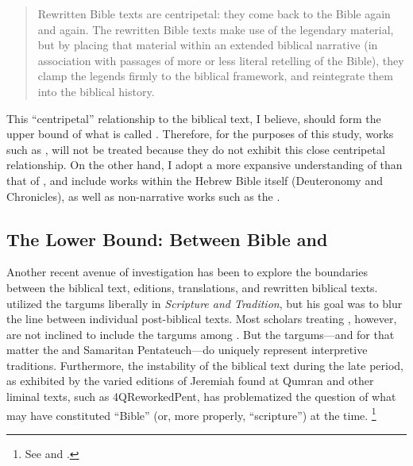 \begin{quote}
    Rewritten Bible texts are centripetal: they come back to the Bible again and again. The rewritten Bible texts make use of the legendary material, but by placing that material within an extended biblical narrative (in association with passages of more or less literal retelling of the Bible), they clamp the legends firmly to the biblical framework, and reintegrate them into the biblical history.%
    \autocite[117]{alexander_carson-williamson1988}
\end{quote} 

This ``centripetal'' relationship to the biblical text, I believe, should form the upper bound of what is called \rwb. Therefore, for the purposes of this study, works such as \firstenoch, will not be treated because they do not exhibit this close centripetal relationship. On the other hand, I adopt a more expansive understanding of \rwb than that of \vermes, and include works within the Hebrew Bible itself (Deuteronomy and Chronicles), as well as non-narrative works such as the \templescroll.


\subsection{The Lower Bound: Between Bible and \rwb}

Another recent avenue of investigation has been to explore the boundaries between the biblical text, editions, translations, and rewritten biblical texts. \vermes utilized the targums liberally in \emph{Scripture and Tradition}, but his goal was to blur the line between individual post-biblical texts. Most scholars treating \rwb, however, are not inclined to include the targums among \rwb. But the targums---and for that matter the \lxx and Samaritan Pentateuch---do uniquely represent interpretive traditions. Furthermore, the instability of the biblical text during the late \secondtemple period, as exhibited by the varied editions of Jeremiah found at Qumran and other liminal texts, such as 4QReworkedPent, has problematized the question of what may have constituted ``Bible'' (or, more properly, ``scripture'') at the time.%
    \footnote{%
        See \cite[229--243]{zahn2011} and \cite{zahn_dsd2008}.}


